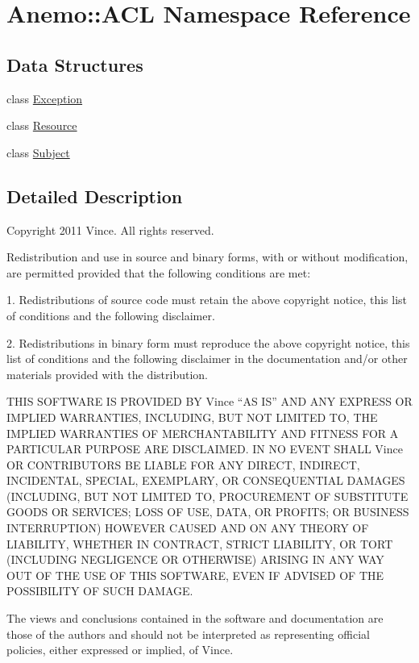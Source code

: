 \hypertarget{namespace_anemo_1_1_a_c_l}{
\section{Anemo::ACL Namespace Reference}
\label{namespace_anemo_1_1_a_c_l}
}
\subsection*{Data Structures}
\begin{DoxyCompactItemize}
\item 
class \hyperlink{class_anemo_1_1_a_c_l_1_1_exception}{Exception}
\item 
class \hyperlink{class_anemo_1_1_a_c_l_1_1_resource}{Resource}
\item 
class \hyperlink{class_anemo_1_1_a_c_l_1_1_subject}{Subject}
\end{DoxyCompactItemize}


\subsection{Detailed Description}
Copyright 2011 Vince. All rights reserved.

Redistribution and use in source and binary forms, with or without modification, are permitted provided that the following conditions are met:

1. Redistributions of source code must retain the above copyright notice, this list of conditions and the following disclaimer.

2. Redistributions in binary form must reproduce the above copyright notice, this list of conditions and the following disclaimer in the documentation and/or other materials provided with the distribution.

THIS SOFTWARE IS PROVIDED BY Vince ``AS IS'' AND ANY EXPRESS OR IMPLIED WARRANTIES, INCLUDING, BUT NOT LIMITED TO, THE IMPLIED WARRANTIES OF MERCHANTABILITY AND FITNESS FOR A PARTICULAR PURPOSE ARE DISCLAIMED. IN NO EVENT SHALL Vince OR CONTRIBUTORS BE LIABLE FOR ANY DIRECT, INDIRECT, INCIDENTAL, SPECIAL, EXEMPLARY, OR CONSEQUENTIAL DAMAGES (INCLUDING, BUT NOT LIMITED TO, PROCUREMENT OF SUBSTITUTE GOODS OR SERVICES; LOSS OF USE, DATA, OR PROFITS; OR BUSINESS INTERRUPTION) HOWEVER CAUSED AND ON ANY THEORY OF LIABILITY, WHETHER IN CONTRACT, STRICT LIABILITY, OR TORT (INCLUDING NEGLIGENCE OR OTHERWISE) ARISING IN ANY WAY OUT OF THE USE OF THIS SOFTWARE, EVEN IF ADVISED OF THE POSSIBILITY OF SUCH DAMAGE.

The views and conclusions contained in the software and documentation are those of the authors and should not be interpreted as representing official policies, either expressed or implied, of Vince. 